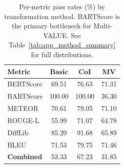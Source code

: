 \begin{table}[t]
\centering
\scriptsize
\begin{tabular}{lccc}
\toprule
\textbf{Metric} & \textbf{Basic} & \textbf{CoI} & \textbf{MV} \\
\midrule
BERTScore & 69.51 & 76.63 & 71.31 \\
BARTScore & 100.00 & 100.00 & 36.30 \\
METEOR & 70.61 & 79.05 & 71.10 \\
ROUGE-L & 55.99 & 71.07 & 64.78 \\
DiffLib & 85.20 & 91.68 & 65.89 \\
BLEU & 71.53 & 79.75 & 71.46 \\
\midrule
\textbf{Combined} & 53.33 & 67.23 & 31.85 \\
\bottomrule
\end{tabular}
\caption{Per-metric pass rates (\%) by transformation method. BARTScore is the primary bottleneck for Multi-VALUE. See Table~\ref{tab:app_method_summary} for full distributions.}
\label{tab:metric_comparison}
\end{table}